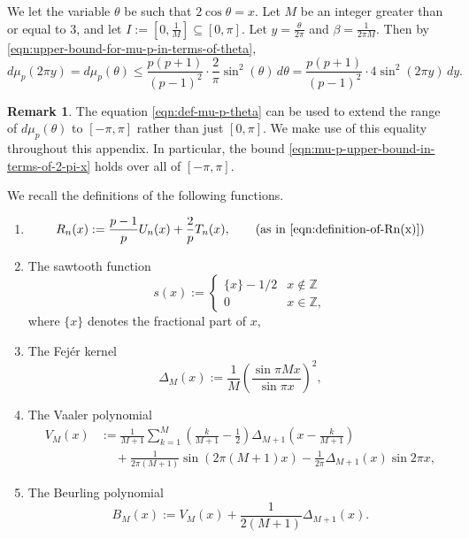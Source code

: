 \documentclass[11pt,letterpaper,reqno]{amsart}
\theoremstyle{definition}
\newtheorem{remark}[theorem]{Remark}
\numberwithin{equation}{section}
\numberwithin{figure}{section}
\numberwithin{table}{section}
\begin{document}
We let the variable $\theta$ be such that $2\cos \theta = x$. Let $M$ be an integer greater than or equal to $3$, and let $I := \left[ 0, \frac{1}{M} \right] \subseteq \left[ 0, \pi \right]$. Let $y = \frac{\theta}{2\pi}$ and $\beta = \frac{1}{2\pi M}$. Then by \eqref{eqn:upper-bound-for-mu-p-in-terms-of-theta},
\begin{equation}
        d\mu_p(2 \pi y) = d\mu_p(\theta) \leq \frac{p(p + 1)}{(p - 1)^2} \cdot \frac{2}{\pi} \sin^2(\theta) \, d \theta = \frac{p(p + 1)}{(p - 1)^2} \cdot 4 \sin^2(2\pi y) \, dy. \label{eqn:mu-p-upper-bound-in-terms-of-2-pi-x}
    \end{equation}
\begin{remark}
    The equation \eqref{eqn:def-mu-p-theta} can be used to extend the range of $d\mu_p(\theta)$ to $[-\pi,\pi]$ rather than just $[0, \pi].$ We make use of this equality throughout this appendix. In particular, the bound \eqref{eqn:mu-p-upper-bound-in-terms-of-2-pi-x} holds over all of $[-\pi,\pi]$.
\end{remark}
We recall the definitions of the following functions.
\begin{enumerate}
    \item 
    \begin{align}
        R_n(x):= \frac{p - 1}{p} U_n(x) + \frac{2}{p} T_n(x), \qquad \text{(as in \eqref{eqn:definition-of-Rn(x)})}
    \end{align}
    \item The sawtooth function
        $$s(x)  := \begin{cases}
        \{x \} - 1/2 & x \notin \mathbb{Z}\\
        0 & x \in \mathbb{Z},
    \end{cases}$$
    where $\{x\}$ denotes the fractional part of $x,$
    \item The Fej\'er kernel
    $$\Delta_M(x) := \frac{1}{M} \left( \frac{\sin \pi M x}{\sin \pi x} \right)^2,$$
    \item The Vaaler polynomial
    \begin{align*}
        V_M(x) &:= \frac{1}{M + 1} \sum_{k = 1}^M \left( \frac{k}{M + 1} - \frac{1}{2}  \right) \Delta_{M + 1} \left( x - \frac{k}{M + 1}  \right)\\
        &\quad\ + \frac{1}{2\pi(M + 1)} \sin\left(2\pi(M + 1)x \right) - \frac{1}{2\pi} \Delta_{M + 1}\left( x  \right) \sin 2 \pi x,
    \end{align*}
    \item The Beurling polynomial
    $$B_M(x) := V_M(x) + \frac{1}{2(M + 1)} \Delta_{M + 1}(x).$$
    \end{enumerate}
\end{document}
